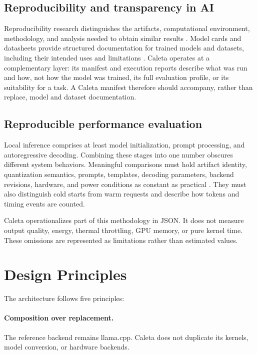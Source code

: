 \documentclass[11pt,a4paper]{article}
\begin{document}
\subsection{Reproducibility and transparency in AI}

Reproducibility research distinguishes the artifacts, computational environment, methodology, and analysis needed to obtain similar results \cite{gundersen,pineau}. Model cards and datasheets provide structured documentation for trained models and datasets, including their intended uses and limitations \cite{modelcards,datasheets}. Caleta operates at a complementary layer: its manifest and execution reports describe what was run and how, not how the model was trained, its full evaluation profile, or its suitability for a task. A Caleta manifest therefore should accompany, rather than replace, model and dataset documentation.

\subsection{Reproducible performance evaluation}

Local inference comprises at least model initialization, prompt processing, and autoregressive decoding. Combining these stages into one number obscures different system behaviors. Meaningful comparisons must hold artifact identity, quantization semantics, prompts, templates, decoding parameters, backend revisions, hardware, and power conditions as constant as practical \cite{pineau}. They must also distinguish cold starts from warm requests and describe how tokens and timing events are counted.

Caleta operationalizes part of this methodology in JSON. It does not measure output quality, energy, thermal throttling, GPU memory, or pure kernel time. These omissions are represented as limitations rather than estimated values.

\section{Design Principles}

The architecture follows five principles:

\paragraph{Composition over replacement.} The reference backend remains llama.cpp. Caleta does not duplicate its kernels, model conversion, or hardware backends.
\end{document}
